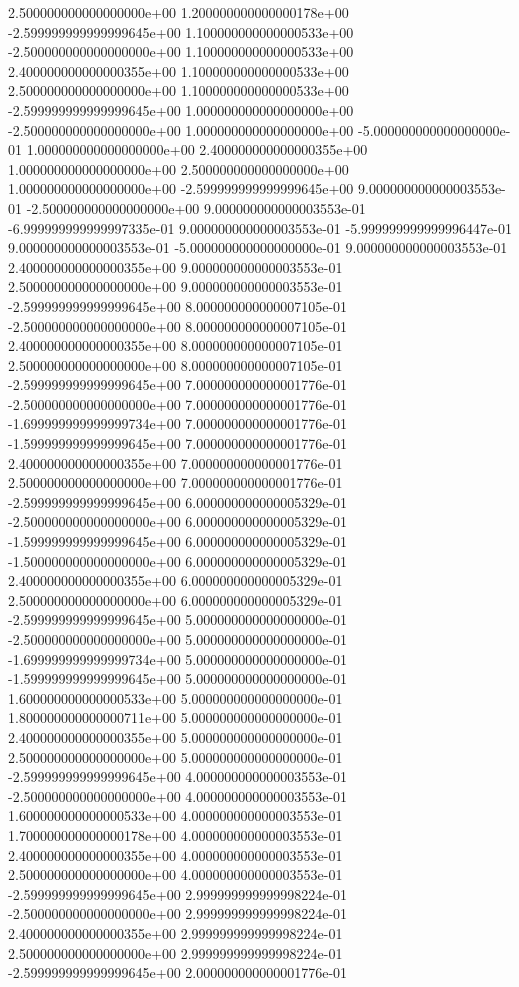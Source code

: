 2.500000000000000000e+00 1.200000000000000178e+00
-2.599999999999999645e+00 1.100000000000000533e+00
-2.500000000000000000e+00 1.100000000000000533e+00
2.400000000000000355e+00 1.100000000000000533e+00
2.500000000000000000e+00 1.100000000000000533e+00
-2.599999999999999645e+00 1.000000000000000000e+00
-2.500000000000000000e+00 1.000000000000000000e+00
-5.000000000000000000e-01 1.000000000000000000e+00
2.400000000000000355e+00 1.000000000000000000e+00
2.500000000000000000e+00 1.000000000000000000e+00
-2.599999999999999645e+00 9.000000000000003553e-01
-2.500000000000000000e+00 9.000000000000003553e-01
-6.999999999999997335e-01 9.000000000000003553e-01
-5.999999999999996447e-01 9.000000000000003553e-01
-5.000000000000000000e-01 9.000000000000003553e-01
2.400000000000000355e+00 9.000000000000003553e-01
2.500000000000000000e+00 9.000000000000003553e-01
-2.599999999999999645e+00 8.000000000000007105e-01
-2.500000000000000000e+00 8.000000000000007105e-01
2.400000000000000355e+00 8.000000000000007105e-01
2.500000000000000000e+00 8.000000000000007105e-01
-2.599999999999999645e+00 7.000000000000001776e-01
-2.500000000000000000e+00 7.000000000000001776e-01
-1.699999999999999734e+00 7.000000000000001776e-01
-1.599999999999999645e+00 7.000000000000001776e-01
2.400000000000000355e+00 7.000000000000001776e-01
2.500000000000000000e+00 7.000000000000001776e-01
-2.599999999999999645e+00 6.000000000000005329e-01
-2.500000000000000000e+00 6.000000000000005329e-01
-1.599999999999999645e+00 6.000000000000005329e-01
-1.500000000000000000e+00 6.000000000000005329e-01
2.400000000000000355e+00 6.000000000000005329e-01
2.500000000000000000e+00 6.000000000000005329e-01
-2.599999999999999645e+00 5.000000000000000000e-01
-2.500000000000000000e+00 5.000000000000000000e-01
-1.699999999999999734e+00 5.000000000000000000e-01
-1.599999999999999645e+00 5.000000000000000000e-01
1.600000000000000533e+00 5.000000000000000000e-01
1.800000000000000711e+00 5.000000000000000000e-01
2.400000000000000355e+00 5.000000000000000000e-01
2.500000000000000000e+00 5.000000000000000000e-01
-2.599999999999999645e+00 4.000000000000003553e-01
-2.500000000000000000e+00 4.000000000000003553e-01
1.600000000000000533e+00 4.000000000000003553e-01
1.700000000000000178e+00 4.000000000000003553e-01
2.400000000000000355e+00 4.000000000000003553e-01
2.500000000000000000e+00 4.000000000000003553e-01
-2.599999999999999645e+00 2.999999999999998224e-01
-2.500000000000000000e+00 2.999999999999998224e-01
2.400000000000000355e+00 2.999999999999998224e-01
2.500000000000000000e+00 2.999999999999998224e-01
-2.599999999999999645e+00 2.000000000000001776e-01
